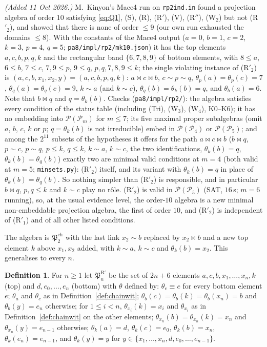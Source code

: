 \documentclass[11pt]{amsart}
\theoremstyle{definition}
\newtheorem{definition}[theorem]{Definition}
\renewcommand{\P}{\mathcal{P}}
\newcommand{\mt}{\bowtie}   %
\begin{document}
\emph{(Added 11 Oct 2026.)} M.~Kinyon's Mace4 run on \texttt{rp2ind.in} found a projection algebra of order $10$ satisfying \eqref{eq:Q1}, (S), (R), (R$'$), (V), (R$''$), (W$_2$) but not (R$'_2$), and showed that there is none of order $\le9$ (our own run exhausted the domains $\le8$). With the constants of the Mace4 output ($a=0$, $b=1$, $c=2$, $k=3$, $p=4$, $q=5$; \texttt{pa8/impl/rp2/mk10.json}) it has the top elements $a,c,b,p,q,k$ and the rectangular band $\{6,7,8,9\}$ of bottom elements, with $8\le a$, $6\le b$, $7\le c$, $7,9\le p$, $9\le q$, $p,q,7,8,9\le k$; the single violating instance of (R$'_2$) is $(a,c,b,x_1,x_2,y)=(a,c,b,p,q,k)$: $a\mt c\mt b$, $c\sim p\sim q$, $\theta_p(a)=\theta_p(c)=7$, $\theta_q(a)=\theta_q(c)=9$, $k\sim a$ (and $k\sim c$), $\theta_q(b)=\theta_k(b)=q$, and $\theta_b(a)=6$. Note that $b\mt q$ and $q=\theta_k(b)$. Checks (\texttt{pa8/impl/rp2/}): the algebra satisfies every condition of the status table (including (Tri), (W$_3$), (W$_4$), K0--K6); it has no embedding into $\P(\P_m)$ for $m\le7$; its five maximal proper subalgebras (omit $a$, $b$, $c$, $k$ or $p$; $q=\theta_k(b)$ is not irreducible) embed in $\P(\P_4)$ or $\P(\P_5)$; and among the $2^{11}$ subsets of the hypotheses it offers for the path $a\mt c\mt b$ ($b\mt q$, $p\sim c$, $p\sim q$, $p\le k$, $q\le k$, $k\sim a$, $k\sim c$, the two identifications, $\theta_k(b)=q$, $\theta_k(b)=\theta_q(b)$) exactly two are minimal valid conditions at $m=4$ (both valid at $m=5$; \texttt{minsets.py}): (R$'_2$) itself, and its variant with $\theta_k(b)=q$ in place of $\theta_k(b)=\theta_q(b)$. So nothing simpler than (R$'_2$) is responsible, and in particular $b\mt q$, $p,q\le k$ and $k\sim c$ play no r\^ole. (R$'_2$) is valid in $\P(\P_5)$ (SAT, $16$\,s; $m=6$ running), so, at the usual evidence level, the order-$10$ algebra is a new minimal non-embeddable projection algebra, the first of order $10$, and (R$'_2$) is independent of (R$'_1$) and of all other listed conditions.

The algebra is $\mathfrak P^{\mathrm{ch}}_2$ with the last link $x_2\sim b$ replaced by $x_2\mt b$ and a new top element $k$ above $x_1,x_2$ added, with $k\sim a$, $k\sim c$ and $\theta_k(b)=x_2$. This generalises to every $n$.

\begin{definition}\label{def:rpwit}
For $n\ge1$ let $\mathfrak P^{\mathrm R'}_n$ be the set of $2n+6$ elements $a,c,b,x_1,\dots,x_n,k$ (top) and $d,e_0,\dots,e_n$ (bottom) with $\theta$ defined by: $\theta_e\equiv e$ for every bottom element $e$; $\theta_a$ and $\theta_c$ as in Definition~\ref{def:chainwit}; $\theta_b(c)=\theta_b(k)=\theta_b(x_n)=b$ and $\theta_b(y)=e_n$ otherwise; for $1\le i<n$, $\theta_{x_i}(k)=x_i$ and $\theta_{x_i}$ as in Definition~\ref{def:chainwit} on the other elements; $\theta_{x_n}(b)=\theta_{x_n}(k)=x_n$ and $\theta_{x_n}(y)=e_{n-1}$ otherwise; $\theta_k(a)=d$, $\theta_k(c)=e_0$, $\theta_k(b)=x_n$, $\theta_k(e_n)=e_{n-1}$, and $\theta_k(y)=y$ for $y\in\{x_1,\dots,x_n,d,e_0,\dots,e_{n-1}\}$.
\end{definition}
\end{document}
